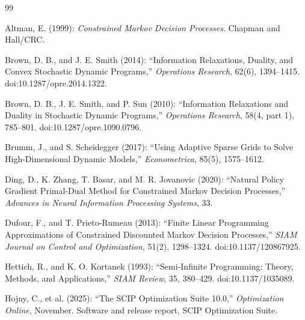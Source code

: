 \begingroup
\makeatletter
\renewcommand{\bibsection}{\@ifundefined{old@section}{\section*{\bibname}}{\old@section*{\bibname}}}
\makeatother
\begin{thebibliography}{99}

Altman, E. (1999): \emph{Constrained Markov Decision Processes}. Chapman and Hall/CRC.

Brown, D. B., and J. E. Smith (2014): ``Information Relaxations, Duality, and Convex Stochastic Dynamic Programs,'' \emph{Operations Research}, 62(6), 1394--1415. doi:10.1287/opre.2014.1322.

Brown, D. B., J. E. Smith, and P. Sun (2010): ``Information Relaxations and Duality in Stochastic Dynamic Programs,'' \emph{Operations Research}, 58(4, part 1), 785--801. doi:10.1287/opre.1090.0796.

Brumm, J., and S. Scheidegger (2017): ``Using Adaptive Sparse Grids to Solve High-Dimensional Dynamic Models,'' \emph{Econometrica}, 85(5), 1575--1612.

Ding, D., K. Zhang, T. Basar, and M. R. Jovanovic (2020): ``Natural Policy Gradient Primal-Dual Method for Constrained Markov Decision Processes,'' \emph{Advances in Neural Information Processing Systems}, 33.

Dufour, F., and T. Prieto-Rumeau (2013): ``Finite Linear Programming Approximations of Constrained Discounted Markov Decision Processes,'' \emph{SIAM Journal on Control and Optimization}, 51(2), 1298--1324. doi:10.1137/120867925.

Hettich, R., and K. O. Kortanek (1993): ``Semi-Infinite Programming: Theory, Methods, and Applications,'' \emph{SIAM Review}, 35, 380--429. doi:10.1137/1035089.


Hojny, C., et al. (2025): ``The SCIP Optimization Suite 10.0,'' \emph{Optimization Online}, November. Software and release report, SCIP Optimization Suite.


\end{thebibliography}

